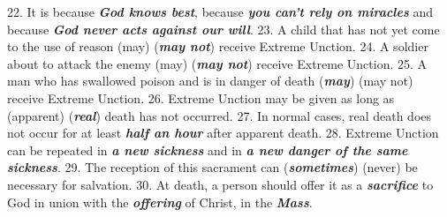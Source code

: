 \documentclass[a4paper,14pt]{memoir}
\newcommand\answer[1]{\textbf{\textit{#1}}}
\begin{document}
22. It is because \answer{God knows best}, because  \answer{you can't rely on miracles}  and
because \answer{God never acts against our will}. 
23. A child that has not yet come to  the  use  of  reason
(may) (\answer{may not}) receive Extreme Unction. 
24. A soldier about to  attack  the
enemy (may) (\answer{may not}) receive Extreme Unction. 
25. A man who  has  swallowed
poison and is in danger of death (\answer{may}) (may not)  receive  Extreme  Unction.
26. Extreme Unction may be given as long as (apparent) (\answer{real}) death has  not
occurred. 
27. In normal cases, real  death  does  not  occur  for  at  least
\answer{half an  hour} after apparent death.  
28.  Extreme  Unction  can  be  repeated  in
\answer{a new sickness}  and  in  \answer{a new danger of the same sickness}.  
29.  The  reception  of  this  sacrament   can
(\answer{sometimes}) (never) be necessary for  salvation.  
30.  At  death,  a  person
should offer it as a \answer{sacrifice} to God in union with the \answer{offering}  of  Christ,
in the \answer{Mass}.
\end{document}
